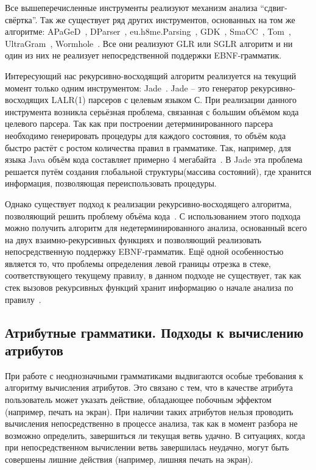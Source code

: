 Все вышеперечисленные инструменты реализуют механизм анализа "`сдвиг-свёртка"'. Так же существует ряд других инструментов, основанных на том же алгоритме: 
APaGeD~\cite{APaGeD}, 
DParser~\cite{DParser}, 
eu.h8me.Parsing~\cite{h8me}, 
GDK~\cite{GDK}, 
SmaCC~\cite{SmaCC}, 
Tom~\cite{Tom}, 
UltraGram~\cite{UltraGram}, 
Wormhole~\cite{Wormhole}. Все они реализуют GLR или SGLR алгоритм и ни один из них не реализует непосредственной поддержки EBNF-грамматик.

Интересующий нас рекурсивно-восходящий алгоритм реализуется на текущий момент только одним инструментом: Jade~\cite{Jade}. Jade -- это генератор рекурсивно-восходящих LALR(1) парсеров с целевым языком С. При реализации данного инструмента возникла серьёзная проблема, связанная с большим объёмом кода целевого парсера. Так как при построении детерминированного парсера необходимо генерировать процедуры для каждого состояния, то объём кода быстро растёт с ростом количества правил в грамматике. Так, например, для языка Java объём кода составляет примерно 4 мегабайта~\cite{Jade}. В Jade  эта проблема решается путём создания глобальной структуры(массива состояний), где хранится информация, позволяющая переиспользовать процедуры.

Однако существует подход к реализации рекурсивно-восходящего алгоритма, позволяющий решить проблему объёма кода~\cite{Non-det-rec-asc}. С использованием этого подхода можно получить алгоритм для недетерминированного анализа, основанный всего на двух взаимно-рекурсивных функциях и позволяющий реализовать непосредственную поддержку EBNF-грамматик. Ещё одной особенностью является то, что проблемы определения левой границы отрезка в стеке, соответствующего текущему правилу, в данном подходе не существует, так как стек вызовов рекурсивных функций хранит информацию о начале анализа по правилу~\cite{Practical Guide}.



\subsection{Атрибутные грамматики. Подходы к вычислению атрибутов}

При работе с неоднозначными грамматиками выдвигаются особые требования к алгоритму вычисления атрибутов. Это связано с тем, что в качестве атрибута пользователь может указать действие, обладающее побочным эффектом (например, печать на экран). При наличии таких атрибутов нельзя проводить вычисления непосредственно в процессе анализа, так как в момент разбора не возможно определить, завершиться ли текущая ветвь удачно. В ситуациях, когда при непосредственном вычислении ветвь завершилась неудачно, могут быть совершены лишние действия (например, лишняя печать на экран).

